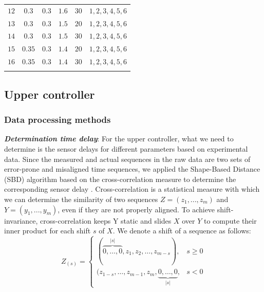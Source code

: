\documentclass[a4paper]{cas-sc}
\begin{document}
\begin{table}
{\begin{tabular}{lccccl}
      $12$             & $0.3$                     & $0.3 $                    & $1.6$                 & $30$          & $1,2,3,4,5,6$                 \\
      $13$             & $0.3$                     & $0.3 $                    & $1.5$                 & $20$          & $1,2,3,4,5,6$                 \\
      $14$             & $0.3$                     & $0.3 $                    & $1.5$                 & $30$          & $1,2,3,4,5,6$                 \\
      $15$             & $0.35$                    & $0.3 $                    & $1.4$                 & $20$          & $1,2,3,4,5,6$                 \\
      $16$             & $0.35$                    & $0.3 $                    & $1.4$                 & $30$          & $1,2,3,4,5,6$                 \\
      \bottomrule
      \label{table1}
    \end{tabular}}
\end{table}











\subsection{Upper controller}
\label{Section 3.2}

\subsubsection{Data processing methods}
\label{Section 3.2.1}

\textbf{\emph{Determination time delay}}: For the upper controller, what we need to determine is the sensor delays for different parameters based on experimental data. Since the measured and actual sequences in the raw data are two sets of error-prone and misaligned time sequences, we applied the Shape-Based Distance (SBD) algorithm based on the cross-correlation measure to determine the corresponding sensor delay \citep{Paparrizos2015}.
Cross-correlation is a statistical measure with which we can determine the similarity of two sequences $Z = (z_1,..., z_m)$ and $Y = (y_1,..., y_m)$, even if they are not properly aligned. To achieve shift-invariance, cross-correlation keeps Y static and slides $X$ over $Y$ to compute their inner product for each shift $s$ of $X$. We denote a shift of a sequence as follows:
\begin{equation}
  Z_{(s)}= \begin{cases}(\overbrace{0, \ldots, 0}^{|s|}, z_{1}, z_{2}, \ldots, z_{m-s}), & s \geq 0 \\ (z_{1-s}, \ldots, z_{m-1}, z_{m}, \underbrace{0, \ldots, 0}_{|s|}, & s<0\end{cases}
  \label{Eq5}
\end{equation}
\end{document}
